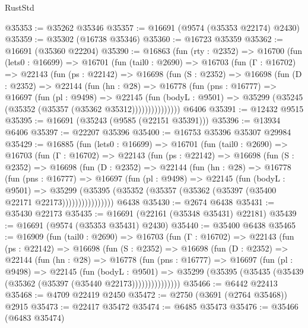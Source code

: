 \begin{lexlean}{RustStd}
\begin{coremodule}
@35353 := @35262 @35346
@35357 := @16691 (@9574 (@35353 @22174) @2430)
@35359 := @35302 (@16738 @35346)
@35360 := @16723 @35359
@35362 := @16691 (@35360 @22204)
@35390 := @16863
    (fun (rty : @2352) =>
    @16700
      (fun (lets0 : @16699) =>
      @16701
        (fun (tail0 : @2690) =>
        @16703
          (fun (Γ : @16702) =>
          @22143
            (fun (ps : @22142) =>
            @16698
              (fun (S : @2352) =>
              @16698
                (fun (D : @2352) =>
                @22144
                  (fun (hn : @28) =>
                  @16778
                    (fun (pns : @16777) =>
                    @16697
                      (fun (pl : @9498) =>
                      @22145
                        (fun (bodyL : @9501) =>
                        @35299 (@35245 (@35352 (@35357 (@35362 @35312)))))))))))))))
    @6406
@35391 := @12432 @9515
@35395 := @16691 (@35243 (@9585 (@22151 @35391)))
@35396 := @13934 @6406
@35397 := @22207 @35396
@35400 := @16753 @35396 @35307 @29984
@35429 := @16885
    (fun (lets0 : @16699) =>
    @16701
      (fun (tail0 : @2690) =>
      @16703
        (fun (Γ : @16702) =>
        @22143
          (fun (ps : @22142) =>
          @16698
            (fun (S : @2352) =>
            @16698
              (fun (D : @2352) =>
              @22144
                (fun (hn : @28) =>
                @16778
                  (fun (pns : @16777) =>
                  @16697
                    (fun (pl : @9498) =>
                    @22145
                      (fun (bodyL : @9501) =>
                      @35299
                        (@35395
                          (@35352 (@35357 (@35362 (@35397 (@35400 @22171 @22173))))))))))))))))
    @6438
@35430 := @2674 @6438
@35431 := @35430 @22173
@35435 := @16691 (@22161 (@35348 @35431) @22181)
@35439 := @16691 (@9574 (@35353 @35431) @2430)
@35440 := @35400 @6438
@35465 := @16909
    (fun (tail0 : @2690) =>
    @16703
      (fun (Γ : @16702) =>
      @22143
        (fun (ps : @22142) =>
        @16698
          (fun (S : @2352) =>
          @16698
            (fun (D : @2352) =>
            @22144
              (fun (hn : @28) =>
              @16778
                (fun (pns : @16777) =>
                @16697
                  (fun (pl : @9498) =>
                  @22145
                    (fun (bodyL : @9501) =>
                    @35299 (@35395 (@35435 (@35439 (@35362 (@35397 (@35440 @22173)))))))))))))))
@35466 := @6442 @22413
@35468 := @4709 @22419 @2450
@35472 := @2750 (@3691 (@2764 @35468)) @2915
@35473 := @22417 @35472
@35474 := @6485 @35473
@35476 := @35466 (@6483 @35474)

\end{coremodule}
\end{lexlean}
